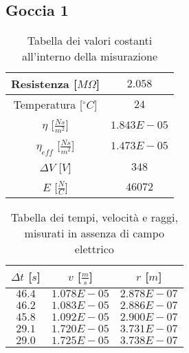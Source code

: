 \documentclass{article}
\begin{document}
\subsection{Goccia 1}
\begin{multicols}{2}
	
\begin{table}[H]
	\centering
	\begin{tabular}{| c | c |}
		\hline
		Resistenza [$M\Omega$] & $2.058$ \\
		\hline
		Temperatura [$^\circ C$] & $24$ \\
		\hline
		$\eta$ [$\frac{Ns}{m^2}$] & $1.843E-05$\\
		\hline
		$\eta_{eff}$ [$\frac{Ns}{m^2}$] & $1.473E-05$\\
		\hline
		$\Delta V$ [$V$] & $348$ \\
		\hline
		$E$ [$\frac N C$] & $46072$\\
		\hline
	\end{tabular}
	\caption{Tabella dei valori costanti all'interno della misurazione}
	\label{}
\end{table}

\columnbreak

\begin{table}[H]
	\centering
	\begin{tabular}{| c | c | c |}
		\hline
		$\Delta t$ [$s$] & $v$ [$\frac ms$] & $r$ [$m$] \\
		\hline
		$46.4$ & $1.078E-05$ & $2.878E-07$ \\
		$46.2$ & $1.083E-05$ & $2.886E-07$ \\
		$45.8$ & $1.092E-05$ & $2.900E-07$ \\
		$29.1$ & $1.720E-05$ & $3.731E-07$ \\
		$29.0$ & $1.725E-05$ & $3.738E-07$ \\
		\hline
	\end{tabular}
	\caption{Tabella dei tempi, velocità e raggi, misurati in assenza di campo elettrico}
	\label{}
\end{table}

\end{multicols}
\end{document}
